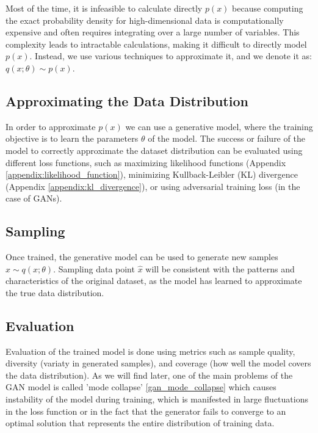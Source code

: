Most of the time, it is infeasible to calculate directly $p(x)$ because computing the exact probability density for high-dimensional data is computationally expensive and often requires integrating over a large number of variables. This complexity leads to intractable calculations, making it difficult to directly model $p(x)$. Instead, we use various techniques to approximate it, and we denote it as: $q(x;\theta) \sim p(x)$.

\subsection{Approximating the Data Distribution}

In order to approximate $p(x)$ we can use a generative model, where the training objective is to learn the parameters $\theta$ of the model. The success or failure of the model to correctly approximate the dataset distribution can be evaluated using different loss functions, such as maximizing likelihood functions (Appendix \ref{appendix:likelihood_function}), minimizing Kullback-Leibler (KL) divergence (Appendix \ref{appendix:kl_divergence}), or using adversarial training loss (in the case of GANs).

\subsection{Sampling}

Once trained, the generative model can be used to generate new samples $\hat{x} \sim q(x;\theta)$. Sampling data point $\hat{x}$ will be consistent with the patterns and characteristics of the original dataset, as the model has learned to approximate the true data distribution.

\subsection{Evaluation}

Evaluation of the trained model is done using metrics such as sample quality, diversity (variaty in generated samples), and coverage (how well the model covers the data distribution). As we will find later, one of the main problems of the GAN model is called 'mode collapse' \ref{gan_mode_collapse} which causes instability of the model during training, which is manifested in large fluctuations in the loss function or in the fact that the generator fails to converge to an optimal solution that represents the entire distribution of training data.

